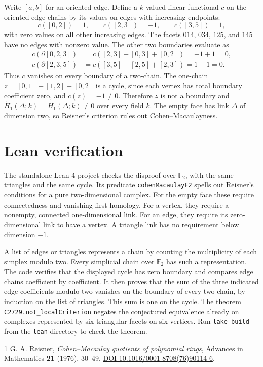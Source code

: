 \documentclass[11pt]{article}
\newcommand{\Ftwo}{\mathbb{F}_2}
\begin{document}
Write $[a,b]$ for an oriented edge. Define a $k$-valued linear functional $c$
on the oriented edge chains by its values on edges with increasing endpoints:
\[
 c([0,2])=1,\qquad c([2,3])=-1,\qquad c([3,5])=1,
\]
with zero values on all other increasing edges. The facets $014$, $034$,
$125$, and $145$ have no edges with nonzero value. The other two boundaries
evaluate as
\[
\begin{aligned}
c(\partial[0,2,3])&=c([2,3]-[0,3]+[0,2])=-1+1=0,\\
c(\partial[2,3,5])&=c([3,5]-[2,5]+[2,3])=1-1=0.
\end{aligned}
\]
Thus $c$ vanishes on every boundary of a two-chain. The one-chain
$z=[0,1]+[1,2]-[0,2]$ is a cycle, since each vertex has total boundary
coefficient zero, and $c(z)=-1\ne0$. Therefore $z$ is not a boundary and
$\widetilde H_1(\Delta;k)=H_1(\Delta;k)\ne0$ over every field $k$.
The empty face has link $\Delta$ of dimension two, so Reisner's criterion
rules out Cohen--Macaulayness.

\section*{Lean verification}

The standalone Lean 4 project checks the disproof over $\Ftwo$, with the same
triangles and the same cycle. Its predicate \texttt{cohenMacaulayF2} spells out
Reisner's conditions for a pure two-dimensional complex. For the empty face
these require connectedness and vanishing first homology. For a vertex, they
require a nonempty, connected one-dimensional link. For an edge, they require
its zero-dimensional link to have a vertex. A triangle link has no requirement
below dimension $-1$.

A list of edges or triangles represents a chain by counting the multiplicity
of each simplex modulo two. Every simplicial chain over $\Ftwo$ has such a
representation. The code verifies that the displayed cycle has zero boundary
and compares edge chains coefficient by coefficient. It then proves that
the sum of the three indicated edge coefficients modulo two vanishes on the
boundary of every two-chain, by induction on the list of triangles. This sum
is one on the cycle. The theorem \texttt{C2729.not\_localCriterion} negates
the conjectured equivalence already on complexes represented by six
triangular facets on six vertices. Run \texttt{lake build} from the
\texttt{lean} directory to check the theorem.

\begin{thebibliography}{1}
G. A. Reisner, \emph{Cohen--Macaulay quotients of polynomial rings},
Advances in Mathematics \textbf{21} (1976), 30--49.
\href{https://doi.org/10.1016/0001-8708(76)90114-6}{DOI 10.1016/0001-8708(76)90114-6}.
\end{thebibliography}
\end{document}
